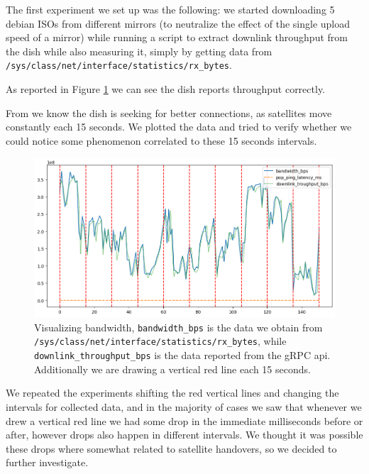 \documentclass[IN,11pt,twoside,openright,bachelor,english]{tumthesis}
\begin{document}
The first experiment we set up was the following: we started downloading 5 debian ISOs from different mirrors (to neutralize the effect of the single upload speed of a mirror) while running a script to extract downlink throughput from the dish while also measuring it, simply by getting data from \texttt{/sys/class/net/{interface}/statistics/rx\_bytes}.

As reported in Figure \ref{fig:vis-bw-15sec} we can see the dish reports throughput correctly.

From \cite{llc-application} we know the dish is seeking for better connections, as satellites move constantly each 15 seconds. We plotted the data and tried to verify whether we could notice some phenomenon correlated to these 15 seconds intervals.

\begin{figure}
	\centering
	\includegraphics[width=1\columnwidth]{img/bw-15seconds.png}
	\caption{Visualizing bandwidth, \texttt{bandwidth\_bps} is the data we obtain from \texttt{/sys/class/net/{interface}/statistics/rx\_bytes}, while \texttt{downlink\_throughput\_bps} is the data reported from the gRPC api. Additionally we are drawing a vertical red line each 15 seconds.}
	\label{fig:vis-bw-15sec}
\end{figure}

We repeated the experiments shifting the red vertical lines and changing the intervals for collected data, and in the majority of cases we saw that whenever we drew a vertical red line we had some drop in the immediate milliseconds before or after, however drops also happen in different intervals. We thought it was possible these drops where somewhat related to satellite handovers, so we decided to further investigate.  

\end{document}
